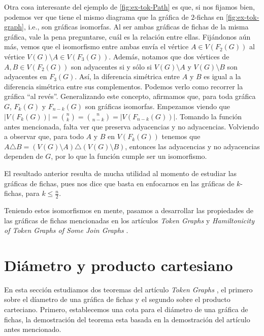 \newpage

Otra cosa interesante del ejemplo de \cref{fig:ex-tok-Path} es que, si nos
fijamos bien, podemos ver que tiene el mismo diagrama que la gr\'afica de
$2$-fichas en \cref{fig:ex-tok-graph}, i.e., son gr\'aficas isomorfas. Al ser
ambas gr\'aficas de fichas de la misma gr\'afica, vale la pena preguntarse,
cu\'al es la relaci\'on entre ellas. Fij\'andonos a\'un m\'as, vemos que el
isomorfismo entre ambas env\'ia el v\'ertice $A \in V(F_2(G))$ al v\'ertice
$V(G) \setminus A \in V(F_3(G))$. Adem\'as, notamos que dos v\'ertices de $ A,B
\in V(F_2(G))$ son adyacentes si y s\'olo si $V(G) \setminus A$ y $V(G)
\setminus B$ son adyacentes en $F_3(G)$. As\'i, la diferencia sim\'etrica entre
$A$ y $B$ es igual a la diferencia sim\'etrica entre sus complementos. Podemos
verlo como recorrer la gr\'afica ``al rev\'es''. Generalizando este concepto,
afirmamos que, para toda gr\'afica $G$, $F_k(G)$ y $F_{n-k}(G)$ son gr\'aficas
isomorfas. Empezamos viendo que $|V(F_k(G))| =\binom{n}{k}= \binom{n}{n-k}=
|V(F_{n-k}(G))|$. Tomando la funci\'on antes mencionada, falta ver que preserva
adyacencias y no adyacencias. Volviendo a observar que, para todo $A$ y $B$ en
$V(F_k(G))$ tenemos que $A \triangle B = (V(G)\setminus A) \triangle
(V(G)\setminus B)$, entonces las adyacencias y no adyacencias dependen de $G$,
por lo que la funci\'on cumple ser un isomorfismo. 

El resultado anterior resulta de mucha utilidad al momento de estudiar las
gr\'aficas de fichas, pues nos dice que basta en enfocarnos en las gr\'aficas de
$k$-fichas, para $k \leq \frac{n}{2}$.

Teniendo estos isomorfismos en mente, pasamos a desarrollar las propiedades de
las gr\'aficas de fichas mencionadas en los art\'iculos \textit{Token Graphs}
\cite{fabilaToken} y \textit{Hamiltonicity of Token Graphs of Some Join Graphs}
\cite{adameHamilt}.


\section{Di\'ametro y producto cartesiano}%
\label{sec:etiquetas}

En esta secci\'on estudiamos dos teoremas del art\'iculo \textit{Token Graphs}
\cite{fabilaToken}, el primero sobre el d\'iametro de una gr\'afica de fichas y
el segundo sobre el producto carteciano. Primero, establecemos una cota para el
di\'ametro de una gr\'afica de fichas, la demostraci\'on del teorema esta basada
en la demostraci\'on del art\'iculo antes mencionado.

